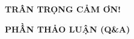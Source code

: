 \documentclass[11pt,aspectratio=169]{beamer}
\begin{document}
{
\begin{frame}[plain]
    \begin{center}
        \vspace{2.5cm}
        \Huge \textbf{TRÂN TRỌNG CẢM ƠN!}
        
        \vspace{1cm}
        \normalsize 
        \textbf{PHẦN THẢO LUẬN (Q\&A)}

    \end{center}
\end{frame}
}
\end{document}
